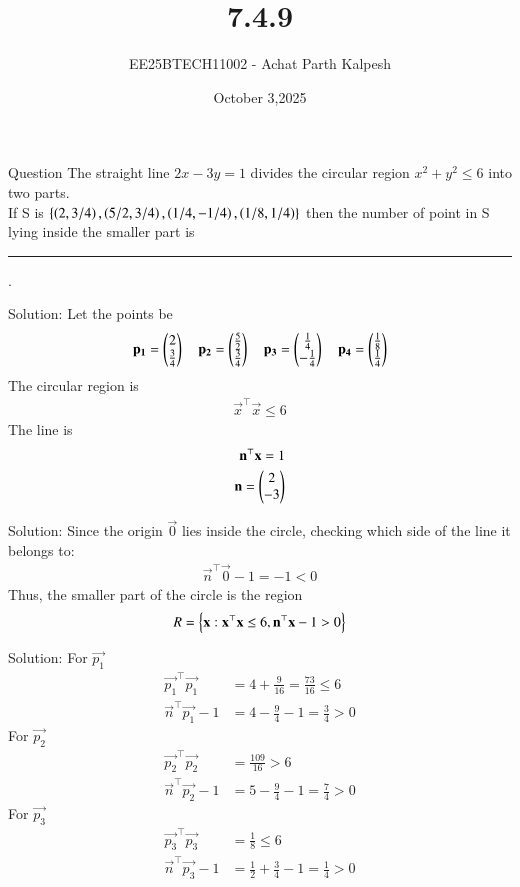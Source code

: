 \documentclass{beamer}
\title %
{7.4.9}
\date{October 3,2025}
\author %
{EE25BTECH11002 - Achat Parth Kalpesh}
\begin{document}
\frame{\titlepage}

\begin{frame}{Question}
   The straight line $2x-3y=1$ divides the circular region $x^2+y^2\leq6$ into two parts.\\
If  S  is $\left\{ \left(2, 3/4\right), \left(5/2, 3/4\right), \left(1/4, -1/4\right), \left(1/8, 1/4\right) \right\}$  then the  number of point in S lying inside the smaller part is  \rule{1cm}{0.01pt}.
\end{frame}

\begin{frame}{Solution:}
Let the points be 
\begin{align}
    \mathbf{p_1} = \begin{pmatrix}2\\ \frac{3}{4}\end{pmatrix} \quad \mathbf{p_2} = \begin{pmatrix}\frac{5}{2}\\ \frac{3}{4}\end{pmatrix} \quad \mathbf{p_3} = \begin{pmatrix}\frac{1}{4}\\ -\frac{1}{4}\end{pmatrix} \quad \mathbf{p_4} = \begin{pmatrix}\frac{1}{8}\\ \frac{1}{4}\end{pmatrix}
\end{align}
The circular region is 
\begin{align}
    \vec{x}^\top \vec{x} \leq 6
\end{align}
The line is
\begin{align}
    \mathbf{n}^\top \mathbf{x} = 1\\
    \mathbf{n} = \begin{pmatrix}2\\-3\end{pmatrix}
\end{align}
\end{frame}

\begin{frame}{Solution:}
Since the origin $\vec{0}$ lies inside the circle, checking which side of the line it belongs to:
\begin{align}
    \vec{n}^\top \vec{0} - 1 = -1 < 0
\end{align}
Thus, the smaller part of the circle is the region
\begin{align}
    R = \left\{\mathbf{x} : \mathbf{x}^\top \mathbf{x} \leq 6,  \mathbf{n}^\top \mathbf{x} - 1 > 0\right\}
\end{align}
\end{frame}

\begin{frame}{Solution:}
For $\vec{p_1}$ 
\begin{align}
  \vec{p_1}^\top \vec{p_1} &= 4 + \frac{9}{16} = \frac{73}{16} \leq 6  \\
  \vec{n}^\top \vec{p_1} - 1 &= 4 - \frac{9}{4} - 1 = \frac{3}{4} > 0
\end{align}
For $\vec{p_2}$
\begin{align}
    \vec{p_2}^\top \vec{p_2} &= \frac{109}{16} > 6\\
    \vec{n}^\top \vec{p_2} - 1 &= 5 - \frac{9}{4} - 1 = \frac{7}{4} > 0
\end{align}
For $\vec{p_3}$
\begin{align}
\vec{p_3}^\top \vec{p_3} &= \frac{1}{8} \leq 6\\
\vec{n}^\top \vec{p_3} - 1 &= \frac{1}{2}+\frac{3}{4}-1 = \frac{1}{4} > 0
\end{align}
\end{frame}
\end{document}
